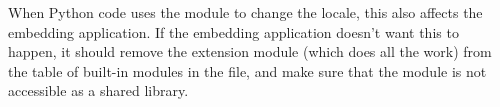 When Python code uses the  module to change the locale,
this also affects the embedding application.  If the embedding
application doesn't want this to happen, it should remove the
 extension module (which does all the work) from the
table of built-in modules in the  file, and make sure
that the  module is not accessible as a shared library.
